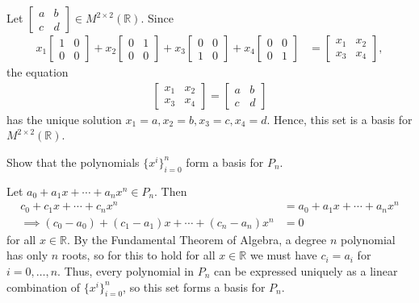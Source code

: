 \documentclass[12pt,letterpaper,reqno]{article}
\numberwithin{equation}{section}
\newcommand{\R}{\ensuremath{\mathbb R}}
\begin{document}
{\color{red}
\begin{solution}
	Let $\begin{bmatrix}
		a & b \\
		c & d
	\end{bmatrix} \in M^{2 \times 2}(\R)$. Since
	\begin{align*}
	x_1	\begin{bmatrix}
		1 & 0 \\ 0 & 0
	\end{bmatrix}+x_2\begin{bmatrix}
		0 & 1 \\ 0 & 0
	\end{bmatrix}+x_3\begin{bmatrix}
		0 & 0 \\ 1 & 0
	\end{bmatrix}+x_4\begin{bmatrix}
		0 & 0 \\ 0 & 1
	\end{bmatrix}&=\begin{bmatrix}
		x_1 & x_2 \\
		x_3 & x_4
	\end{bmatrix},
	\end{align*}
	the equation 
	\begin{align*}
		\begin{bmatrix}
		x_1 & x_2 \\
		x_3 & x_4
	\end{bmatrix}=\begin{bmatrix}
		a & b \\
		c & d
	\end{bmatrix}
	\end{align*}
	has the unique solution $x_1=a, x_2=b, x_3=c, x_4=d$. Hence, this set is a basis for $M^{2 \times 2}(\R)$.
\end{solution}}

\begin{exercise}
Show that the polynomials $\{x^i\}_{i=0}^n$ form a basis for $P_n$.	
\end{exercise}

{\color{red}
\begin{solution}
	Let $a_0+a_1x+\cdots+a_nx^n \in P_n$. Then 
	\begin{align*}
		c_0+c_1x+\cdots+c_nx^n&=a_0+a_1x+\cdots+a_nx^n \\
		\implies (c_0-a_0)+(c_1-a_1)x+\cdots+(c_n-a_n)x^n&=0
	\end{align*}
	for all $x \in \R$. By the Fundamental Theorem of Algebra, a degree $n$ polynomial has only $n$ roots, so for this to hold for all $x \in \R$ we must have $c_i=a_i$ for $i=0,\dots, n$. Thus, every polynomial in $P_n$ can be expressed uniquely as a linear combination of $\{x^i\}_{i=0}^n$, so this set forms a basis for $P_n$.
\end{solution}}
\end{document}
